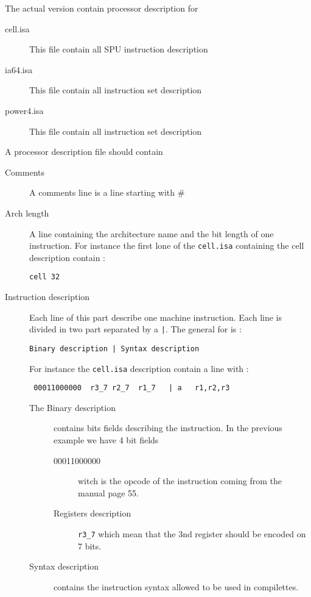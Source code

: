 \documentclass{article}
\begin{document}
The actual version contain processor description for 
\begin{description}
\item[cell.isa] This file contain all SPU instruction description
\item[ia64.isa] This file contain all instruction set description
\item[power4.isa] This file contain all instruction set description
\end{description}

A processor description file should contain
\begin{description}
\item[Comments] A comments line is a line starting with \#
\item[Arch length] A line containing the architecture name and the bit
  length of one instruction. For instance the first lone of the 
\verb|cell.isa| containing the cell description contain :
\begin{verbatim}
cell 32
\end{verbatim}
\item[Instruction description] Each line of this part describe one
  machine instruction. Each line is divided in two part separated by a
  \verb-|-. The general for is :

\begin{verbatim}
Binary description | Syntax description
\end{verbatim}

For instance the \verb|cell.isa| description contain a line with :
\begin{verbatim}
 00011000000  r3_7 r2_7  r1_7   | a   r1,r2,r3
\end{verbatim}
  \begin{description}
  \item[The Binary description] contains bits fields describing the
    instruction. In the previous example we have 4 bit fields
    \begin{description}
      \item[00011000000] witch is the opcode of the instruction
        coming from the manual\cite{SPU1} page 55.
      \item[Registers description] \verb|r3_7| which mean that the 3nd
        register should be encoded on 7 bits.
    \end{description}
  \item[Syntax description] contains the instruction syntax allowed to
    be used in compilettes.
  \end{description}

\end{description}
\end{document}
